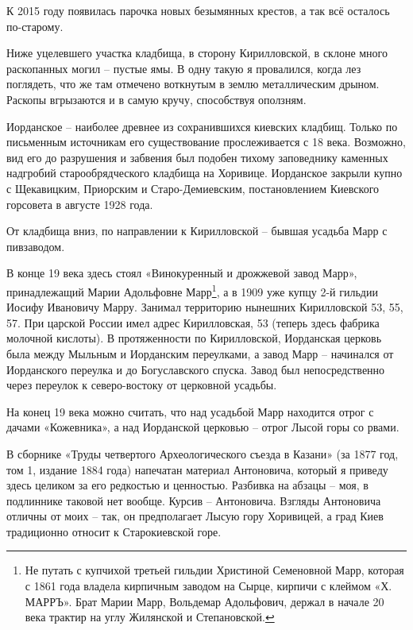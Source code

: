 К 2015 году появилась парочка новых безымянных крестов, а так всё осталось по-старому.

Ниже уцелевшего участка кладбища, в сторону Кирилловской, в склоне много раскопанных могил – пустые ямы. В одну такую я провалился, когда лез поглядеть, что же там отмечено воткнутым в землю металлическим дрыном. Раскопы вгрызаются и в самую кручу, способствуя оползням.

Иорданское – наиболее древнее из сохранившихся киевских кладбищ. Только по письменным источникам его существование прослеживается с 18 века. Возможно, вид его до разрушения и забвения был подобен тихому заповеднику каменных надгробий старообрядческого кладбища на Хоривице. Иорданское закрыли купно с Щекавицким, Приорским и Старо-Демиевским, постановлением Киевского горсовета в августе 1928 года.

От кладбища вниз, по направлении к Кирилловской – бывшая усадьба Марр с пивзаводом.

В конце 19 века здесь стоял «Винокуренный и дрожжевой завод Марр», принадлежащий Марии Адольфовне Марр\footnote{Не путать с купчихой третьей гильдии Христиной Семеновной Марр, которая с 1861 года владела кирпичным заводом на Сырце, кирпичи с клеймом «Х. МАРРЪ». Брат Марии Марр, Вольдемар Адольфович, держал в начале 20 века трактир на углу Жилянской и Степановской.}, а в 1909 уже купцу 2-й гильдии Иосифу Ивановичу Марру. Занимал территорию нынешних Кирилловской 53, 55, 57. При царской России имел адрес Кирилловская, 53 (теперь здесь фабрика молочной кислоты). В протяженности по Кирилловской, Иорданская церковь была между Мыльным и Иорданским переулками, а завод Марр – начинался от Иорданского переулка и до Богуславского спуска. Завод был непосредственно через переулок к северо-востоку от церковной усадьбы.

На конец 19 века можно считать, что над усадьбой Марр находится отрог с дачами «Кожевника», а над Иорданской церковью – отрог Лысой горы со рвами.


В сборнике «Труды четвертого Археологического съезда в Казани» (за 1877 год, том 1, издание 1884 года) напечатан материал Антоновича, который я приведу здесь целиком за его редкостью и ценностью. Разбивка на абзацы – моя, в подлиннике таковой нет вообще. Курсив – Антоновича. Взгляды Антоновича отличны от моих – так, он предполагает Лысую гору Хоривицей, а град Киев традиционно относит к Старокиевской горе. 

